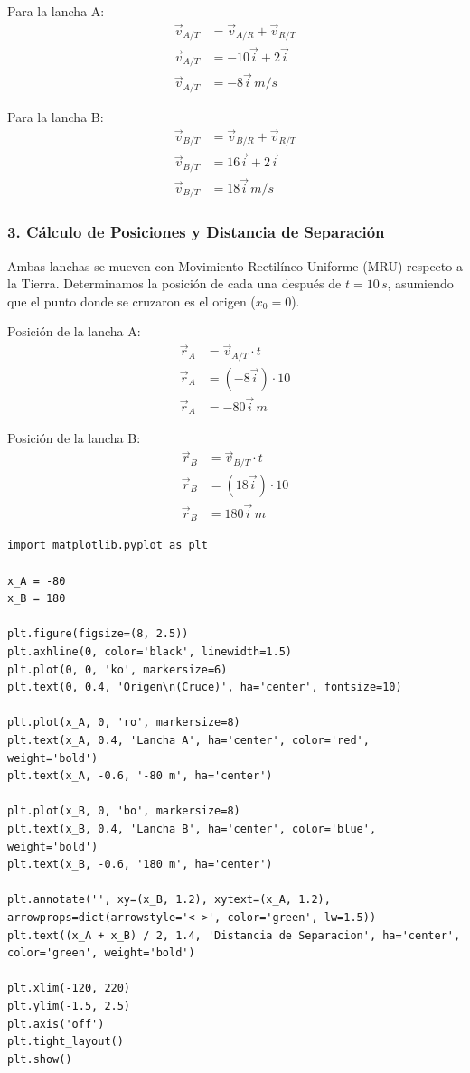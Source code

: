 \documentclass[12pt, a4paper]{article}
\begin{document}
Para la lancha A:
\begin{align*}
\vec{v}_{A/T} &= \vec{v}_{A/R} + \vec{v}_{R/T} \\
\vec{v}_{A/T} &= -10\vec{i} + 2\vec{i} \\
\vec{v}_{A/T} &= -8\vec{i} \, \si{m/s}
\end{align*}

Para la lancha B:
\begin{align*}
\vec{v}_{B/T} &= \vec{v}_{B/R} + \vec{v}_{R/T} \\
\vec{v}_{B/T} &= 16\vec{i} + 2\vec{i} \\
\vec{v}_{B/T} &= 18\vec{i} \, \si{m/s}
\end{align*}

\subsubsection*{3. Cálculo de Posiciones y Distancia de Separación}
Ambas lanchas se mueven con Movimiento Rectilíneo Uniforme (MRU) respecto a la Tierra. Determinamos la posición de cada una después de $t = 10 \, \si{s}$, asumiendo que el punto donde se cruzaron es el origen ($x_0 = 0$).

Posición de la lancha A:
\begin{align*}
\vec{r}_A &= \vec{v}_{A/T} \cdot t \\
\vec{r}_A &= (-8\vec{i}) \cdot 10 \\
\vec{r}_A &= -80\vec{i} \, \si{m}
\end{align*}

Posición de la lancha B:
\begin{align*}
\vec{r}_B &= \vec{v}_{B/T} \cdot t \\
\vec{r}_B &= (18\vec{i}) \cdot 10 \\
\vec{r}_B &= 180\vec{i} \, \si{m}
\end{align*}

\begin{lstlisting}
import matplotlib.pyplot as plt

x_A = -80
x_B = 180

plt.figure(figsize=(8, 2.5))
plt.axhline(0, color='black', linewidth=1.5)
plt.plot(0, 0, 'ko', markersize=6)
plt.text(0, 0.4, 'Origen\n(Cruce)', ha='center', fontsize=10)

plt.plot(x_A, 0, 'ro', markersize=8)
plt.text(x_A, 0.4, 'Lancha A', ha='center', color='red', weight='bold')
plt.text(x_A, -0.6, '-80 m', ha='center')

plt.plot(x_B, 0, 'bo', markersize=8)
plt.text(x_B, 0.4, 'Lancha B', ha='center', color='blue', weight='bold')
plt.text(x_B, -0.6, '180 m', ha='center')

plt.annotate('', xy=(x_B, 1.2), xytext=(x_A, 1.2), arrowprops=dict(arrowstyle='<->', color='green', lw=1.5))
plt.text((x_A + x_B) / 2, 1.4, 'Distancia de Separacion', ha='center', color='green', weight='bold')

plt.xlim(-120, 220)
plt.ylim(-1.5, 2.5)
plt.axis('off')
plt.tight_layout()
plt.show()
\end{lstlisting}
\end{document}
